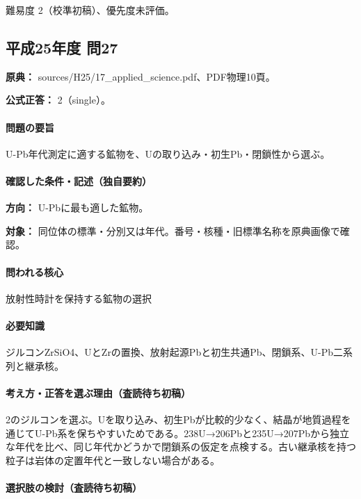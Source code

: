 \par 難易度 2（校準初稿）、優先度未評価。

\subsection{平成25年度 問27}
\label{q:h25-reg-applied-27}

\noindent\textbf{原典：} sources/H25/17\_applied\_science.pdf、PDF物理10頁。

\textbf{公式正答：} 2（single）。

\paragraph{問題の要旨} U-Pb年代測定に適する鉱物を、Uの取り込み・初生Pb・閉鎖性から選ぶ。

\paragraph{確認した条件・記述（独自要約）}\mbox{}\par

\noindent\textbf{方向：} U-Pbに最も適した鉱物。\par

\noindent\textbf{対象：} 同位体の標準・分別又は年代。番号・核種・旧標準名称を原典画像で確認。\par

\paragraph{問われる核心} 放射性時計を保持する鉱物の選択

\paragraph{必要知識} ジルコンZrSiO4、UとZrの置換、放射起源Pbと初生共通Pb、閉鎖系、U-Pb二系列と継承核。

\paragraph{考え方・正答を選ぶ理由（査読待ち初稿）} 2のジルコンを選ぶ。Uを取り込み、初生Pbが比較的少なく、結晶が地質過程を通じてU-Pb系を保ちやすいためである。238U→206Pbと235U→207Pbから独立な年代を比べ、同じ年代かどうかで閉鎖系の仮定を点検する。古い継承核を持つ粒子は岩体の定置年代と一致しない場合がある。

\paragraph{選択肢の検討（査読待ち初稿）}\mbox{}\par

